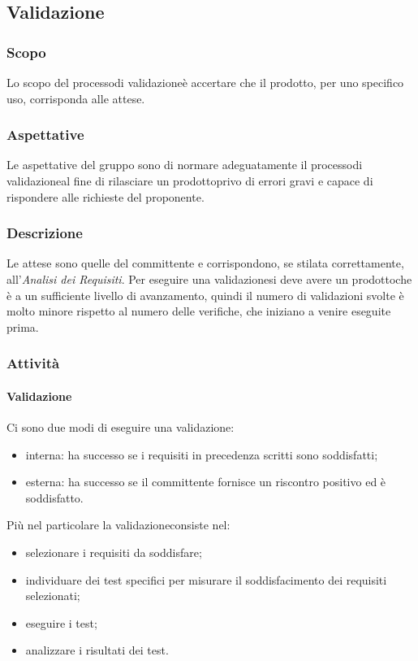 \subsection{Validazione}

\subsubsection{Scopo}
Lo scopo del processo\glosp di validazione\glosp è accertare che il prodotto\glo, per uno specifico uso, corrisponda alle attese.

\subsubsection{Aspettative}
Le aspettative del gruppo sono di normare adeguatamente il processo\glosp di validazione\glosp al fine di rilasciare un prodotto\glosp privo di errori gravi e capace di rispondere alle richieste del proponente.

\subsubsection{Descrizione}
Le attese sono quelle del committente e corrispondono, se stilata correttamente, all'\textit{Analisi dei Requisiti}. 
Per eseguire una validazione\glosp si deve avere un prodotto\glosp che è a un sufficiente livello di avanzamento, quindi il numero di validazioni svolte è molto minore rispetto al numero delle verifiche, che iniziano a venire eseguite prima.

\subsubsection{Attività}
	\paragraph{Validazione}
	Ci sono due modi di eseguire una validazione\glo:
	\begin{itemize}
		\item interna: ha successo se i requisiti in precedenza scritti sono soddisfatti;
		\item esterna: ha successo se il committente fornisce un riscontro positivo ed è soddisfatto.
	\end{itemize}
	Più nel particolare la validazione\glosp consiste nel:	
	\begin{itemize}
		\item selezionare i requisiti da soddisfare;
		\item individuare dei test specifici per misurare il soddisfacimento dei requisiti selezionati;
		\item eseguire i test;
		\item analizzare i risultati dei test.
	\end{itemize}